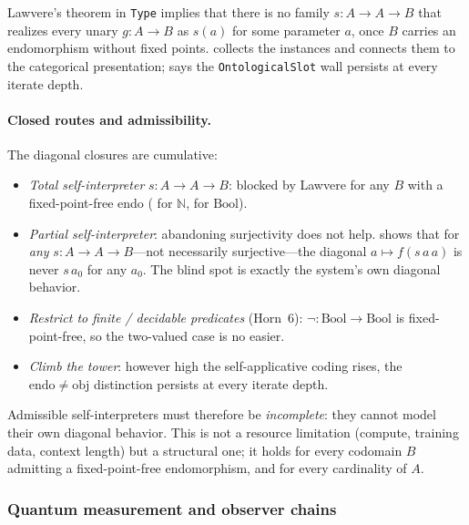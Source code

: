 \documentclass[11pt]{article}
\begin{document}
Lawvere's theorem in \texttt{Type} implies that there is no family
$s : A \to A \to B$ that realizes every unary $g : A \to B$ as $s(a)$ for some
parameter $a$, once $B$ carries an endomorphism without fixed points.
 collects the instances and connects them to
the categorical presentation;
 says the
\texttt{OntologicalSlot} wall persists at every iterate depth.

\paragraph{Closed routes and admissibility.}
The diagonal closures are cumulative:
\begin{itemize}[leftmargin=1.5em,itemsep=0pt,topsep=0.3ex,parsep=0pt]
\item \emph{Total self-interpreter} $s : A \to A \to B$: blocked by
  Lawvere for any $B$ with a fixed-point-free endo
  ( for $\mathbb{N}$,
   for $\mathrm{Bool}$).
\item \emph{Partial self-interpreter}: abandoning surjectivity does not
  help.   shows that for
  \emph{any} $s : A \to A \to B$---not necessarily surjective---the
  diagonal $a \mapsto f(s\,a\,a)$ is never $s\,a_0$ for any $a_0$.
  The blind spot is exactly the system's own diagonal behavior.
\item \emph{Restrict to finite / decidable predicates} (Horn~6):
  $\lnot : \mathrm{Bool} \to \mathrm{Bool}$ is fixed-point-free, so the
  two-valued case is no easier.
\item \emph{Climb the tower}: however high the self-applicative coding
  rises, the $\mathrm{endo} \neq \mathrm{obj}$ distinction persists at
  every iterate depth.
\end{itemize}
Admissible self-interpreters must therefore be \emph{incomplete}: they
cannot model their own diagonal behavior.  This is not a resource
limitation (compute, training data, context length) but a structural
one; it holds for every codomain $B$ admitting a fixed-point-free
endomorphism, and for every cardinality of $A$.

\subsubsection{Quantum measurement and observer chains}
\end{document}
